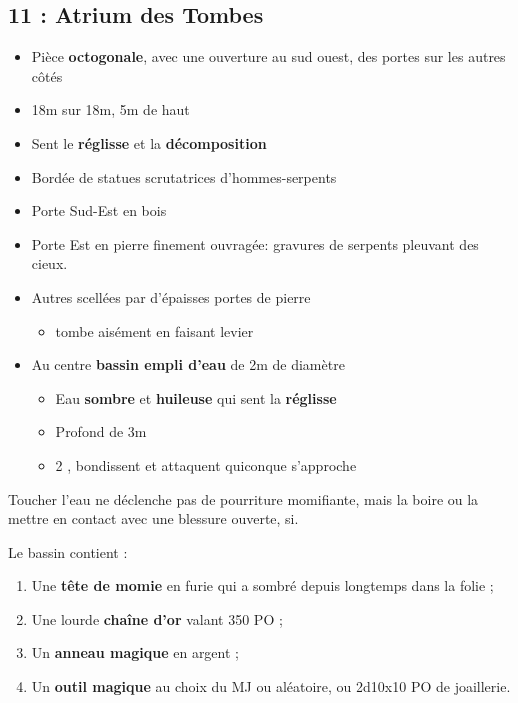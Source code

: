 \subsection{11 : Atrium des Tombes}\label{n2:s11}
\begin{itemize}
    \item Pièce \textbf{octogonale}, avec une ouverture au sud ouest, des portes sur les autres côtés
    \item 18m sur 18m, 5m de haut
    \item Sent le \textbf{réglisse} et la \textbf{décomposition}
    \item Bordée de statues scrutatrices d’hommes-serpents
    \item Porte Sud-Est en bois
    \item Porte Est en pierre finement ouvragée: gravures de serpents pleuvant des cieux.
    \item Autres scellées par d’épaisses portes de pierre
    \begin{itemize}
        \item tombe aisément en faisant levier
    \end{itemize}
    \item Au centre \textbf{bassin empli d'eau} de 2m de diamètre
    \begin{itemize}
        \item Eau \textbf{sombre} et \textbf{huileuse} qui sent la \textbf{réglisse}
        \item Profond de 3m
        \item 2 \textbf{}, bondissent et attaquent quiconque s’approche
    \end{itemize}
\end{itemize}



Toucher l’eau ne déclenche pas de pourriture momifiante, mais la boire ou la mettre en contact avec une blessure ouverte, si.

Le bassin contient :
\begin{enumerate}
    \item Une \textbf{tête de momie} en furie qui a sombré depuis longtemps dans la folie ;
    \item Une lourde \textbf{chaîne d’or} valant 350 PO ;
    \item Un \textbf{anneau magique} en argent ;
    \item Un \textbf{outil magique} au choix du MJ ou aléatoire, ou 2d10x10 PO de joaillerie.
\end{enumerate}

